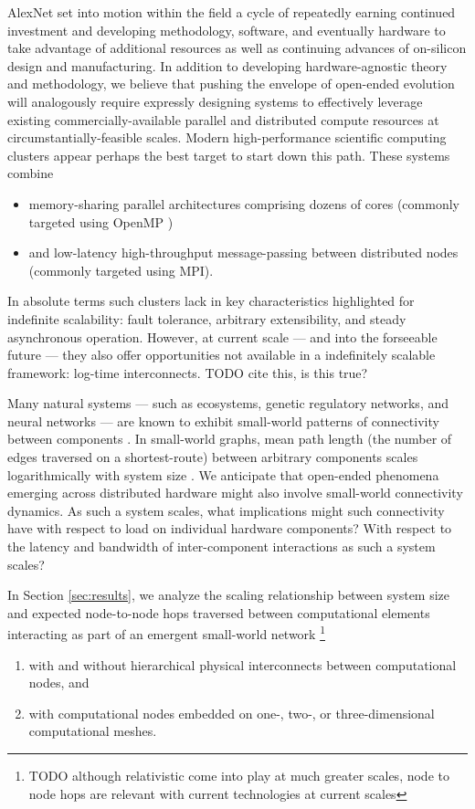 AlexNet set into motion within the field a cycle of repeatedly earning continued investment and developing methodology, software, and eventually hardware to take advantage of additional resources as well as continuing advances of on-silicon design and manufacturing.
In addition to developing hardware-agnostic theory and methodology, we believe that pushing the envelope of open-ended evolution will analogously require expressly designing systems to effectively leverage existing commercially-available parallel and distributed compute resources at circumstantially-feasible scales.
Modern high-performance scientific computing clusters appear perhaps the best target to start down this path.
These systems combine
\begin{itemize}
\item memory-sharing parallel architectures comprising dozens of cores (commonly targeted using OpenMP \citep{dagum1998openmp})
\item and low-latency high-throughput message-passing between distributed nodes (commonly targeted using MPI\citep{clarke1994mpi}).
\end{itemize}

In absolute terms such clusters lack in key characteristics highlighted for indefinite scalability: fault tolerance, arbitrary extensibility, and steady asynchronous operation.
However, at current scale --- and into the forseeable future --- they also offer opportunities not available in a indefinitely scalable framework: log-time interconnects.
TODO cite this, is this true?

Many natural systems --- such as ecosystems, genetic regulatory networks, and neural networks --- are known to exhibit small-world patterns of connectivity between components \citep{bassett2017small, fox2014herbivores, gaiteri2014beyond}.
In small-world graphs, mean path length (the number of edges traversed on a shortest-route) between arbitrary components scales logarithmically with system size \citep{watts1998collective}.
We anticipate that open-ended phenomena emerging across distributed hardware might also involve small-world connectivity dynamics.
As such a system scales, what implications might such connectivity have with respect to load on individual hardware components?
With respect to the latency and bandwidth of inter-component interactions as such a system scales?

In Section \ref{sec:results}, we analyze the scaling relationship between system size and expected node-to-node hops traversed between computational elements interacting as part of an emergent small-world network
\footnote{
TODO although relativistic come into play at much greater scales, node to node hops are relevant with current technologies at current scales
}
\begin{enumerate}
\item with and without hierarchical physical interconnects between computational nodes, and
\item with computational nodes embedded on one-, two-, or three-dimensional computational meshes.
\end{enumerate}

